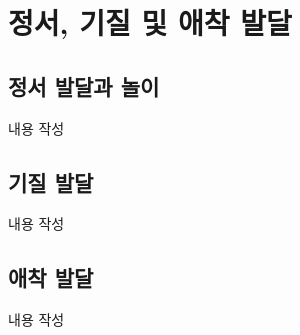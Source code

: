 \section{정서, 기질 및 애착 발달}

\subsection{정서 발달과 놀이}
내용 작성

\subsection{기질 발달}
내용 작성

\subsection{애착 발달}
내용 작성
